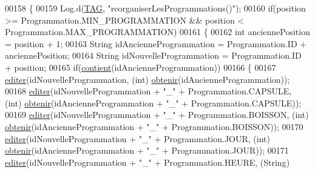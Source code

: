 \begin{DoxyCode}
00158     \{
00159         Log.d(\hyperlink{classcom_1_1example_1_1ekawa_1_1_preference_aeb5e1e787153c37929839622ac5d0339}{TAG}, \textcolor{stringliteral}{"reorganiserLesProgrammations()"});
00160         \textcolor{keywordflow}{if}(position >= Programmation.MIN\_PROGRAMMATION && position < Programmation.MAX\_PROGRAMMATION)
00161         \{
00162             \textcolor{keywordtype}{int} anciennePosition = position + 1;
00163             String idAncienneProgrammation = Programmation.ID + anciennePosition;
00164             String idNouvelleProgrammation = Programmation.ID + position;
00165             \textcolor{keywordflow}{if}(\hyperlink{classcom_1_1example_1_1ekawa_1_1_preference_a25b7a4cfcc9fe5f9258471ce454a718a}{contient}(idAncienneProgrammation))
00166             \{
00167                 \hyperlink{classcom_1_1example_1_1ekawa_1_1_preference_a5af7a0595acfd41f1bd0b34ca0bfcb2a}{editer}(idNouvelleProgrammation, (\textcolor{keywordtype}{int}) \hyperlink{classcom_1_1example_1_1ekawa_1_1_preference_a485d7fe31708aa1b85c0e2dcdcc05c0d}{obtenir}(idAncienneProgrammation));
00168                 \hyperlink{classcom_1_1example_1_1ekawa_1_1_preference_a5af7a0595acfd41f1bd0b34ca0bfcb2a}{editer}(idNouvelleProgrammation + \textcolor{stringliteral}{"\_"} + Programmation.CAPSULE, (\textcolor{keywordtype}{int}) 
      \hyperlink{classcom_1_1example_1_1ekawa_1_1_preference_a485d7fe31708aa1b85c0e2dcdcc05c0d}{obtenir}(idAncienneProgrammation + \textcolor{stringliteral}{"\_"} + Programmation.CAPSULE));
00169                 \hyperlink{classcom_1_1example_1_1ekawa_1_1_preference_a5af7a0595acfd41f1bd0b34ca0bfcb2a}{editer}(idNouvelleProgrammation + \textcolor{stringliteral}{"\_"} + Programmation.BOISSON, (\textcolor{keywordtype}{int}) 
      \hyperlink{classcom_1_1example_1_1ekawa_1_1_preference_a485d7fe31708aa1b85c0e2dcdcc05c0d}{obtenir}(idAncienneProgrammation + \textcolor{stringliteral}{"\_"} + Programmation.BOISSON));
00170                 \hyperlink{classcom_1_1example_1_1ekawa_1_1_preference_a5af7a0595acfd41f1bd0b34ca0bfcb2a}{editer}(idNouvelleProgrammation + \textcolor{stringliteral}{"\_"} + Programmation.JOUR, (\textcolor{keywordtype}{int}) 
      \hyperlink{classcom_1_1example_1_1ekawa_1_1_preference_a485d7fe31708aa1b85c0e2dcdcc05c0d}{obtenir}(idAncienneProgrammation + \textcolor{stringliteral}{"\_"} + Programmation.JOUR));
00171                 \hyperlink{classcom_1_1example_1_1ekawa_1_1_preference_a5af7a0595acfd41f1bd0b34ca0bfcb2a}{editer}(idNouvelleProgrammation + \textcolor{stringliteral}{"\_"} + Programmation.HEURE, (String) 

\end{DoxyCode}

